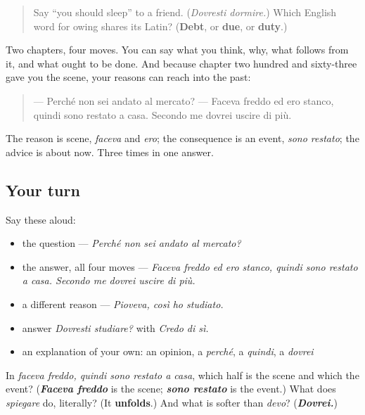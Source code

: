 \label{lesson:IT-C266-ripasso-spiegazione}



\begin{quote}
Say \textquotedblleft{}you should sleep\textquotedblright{} to a friend. (\emph{Dovresti dormire.}) Which English word for owing shares its Latin? (\textbf{Debt}, or \textbf{due}, or \textbf{duty}.)
\end{quote}

\begin{grammarlens}[title={What you've built}]
Two chapters, four moves. You can say what you think, why, what follows from it, and what ought to be done. And because chapter two hundred and sixty-three gave you the scene, your reasons can reach into the past:

\begin{quote}
— Perché non sei andato al mercato? — Faceva freddo ed ero stanco, quindi sono restato a casa. Secondo me dovrei uscire di più.
\end{quote}

The reason is scene, \emph{faceva} and \emph{ero}; the consequence is an event, \emph{sono restato}; the advice is about now. Three times in one answer.
\end{grammarlens}

\subsection*{Your turn}
Say these aloud:

\begin{itemize}
\raggedright
  \item the question — \emph{Perché non sei andato al mercato?}
  \item the answer, all four moves — \emph{Faceva freddo ed ero stanco, quindi sono restato a casa. Secondo me dovrei uscire di più.}
  \item a different reason — \emph{Pioveva, così ho studiato.}
  \item answer \emph{Dovresti studiare?} with \emph{Credo di sì.}
  \item an explanation of your own: an opinion, a \emph{perché}, a \emph{quindi}, a \emph{dovrei}
\end{itemize}

\begin{tcolorbox}[breakable,colback=teal!4,colframe=teal!35!black,title={Before you move on}]
In \emph{faceva freddo, quindi sono restato a casa}, which half is the scene and which the event? (\emph{\textbf{Faceva freddo}} is the scene; \emph{\textbf{sono restato}} is the event.) What does \emph{spiegare} do, literally? (It \textbf{unfolds}.) And what is softer than \emph{devo}? (\emph{\textbf{Dovrei.}})
\end{tcolorbox}
